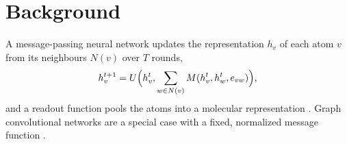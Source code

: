 \chapter{Background}
\label{ch:background}

A message-passing neural network updates the representation $h_v$ of each atom $v$ from its
neighbours $N(v)$ over $T$ rounds,
\begin{equation}
  h_v^{t+1} = U\Bigl(h_v^{t}, \sum_{w \in N(v)} M(h_v^{t}, h_w^{t}, e_{vw})\Bigr),
  \label{eq:mpnn}
\end{equation}
and a readout function pools the atoms into a molecular representation \citep{gilmer2017}.
Graph convolutional networks are a special case with a fixed, normalized message function
\citep{kipf2017}.
